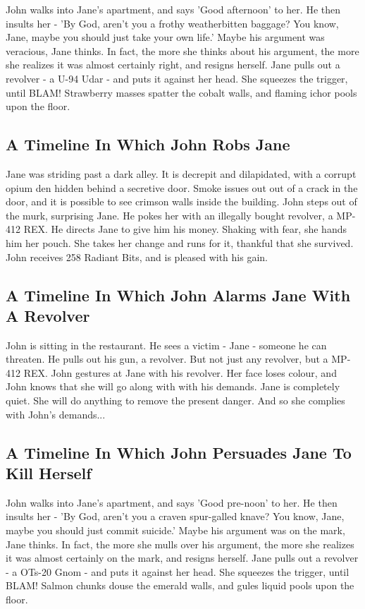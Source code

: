 \documentclass{article}
\begin{document}
John walks into Jane's apartment, and says 'Good afternoon' to her.
He then insults her {-} 'By God, aren't you a frothy weatherbitten baggage?
You know, Jane, maybe you should just take your own life.'
Maybe his argument was veracious, Jane thinks.
In fact, the more she thinks about his argument, the more she realizes it was almost certainly right, and resigns herself.
Jane pulls out a revolver {-} a U{-}94 Udar {-} and puts it against her head.
She squeezes the trigger, until BLAM!
Strawberry masses spatter the cobalt walls, and flaming ichor pools upon the floor.
\subsection{A Timeline In Which John Robs Jane}


Jane was striding past a dark alley.
It is decrepit and dilapidated, with a corrupt opium den hidden behind a secretive door.
Smoke issues out out of a crack in the door, and it is possible to see crimson walls inside the building.
John steps out of the murk, surprising Jane.
He pokes her with an illegally bought revolver, a MP{-}412 REX.
He directs Jane to give him his money.
Shaking with fear, she hands him her pouch.
She takes her change and runs for it, thankful that she survived.
John receives 258 Radiant Bits, and is pleased with his gain.
\subsection{A Timeline In Which John Alarms Jane With A Revolver}


John is sitting in the restaurant.
He sees a victim {-} Jane {-} someone he can threaten. He pulls out his gun, a revolver.
But not just any revolver, but a MP{-}412 REX.
John gestures at Jane with his revolver. Her face loses colour, and John knows that she will go along with with his demands.
Jane is completely quiet. She will do anything to remove the present danger. And so she complies with John's demands...
\subsection{A Timeline In Which John Persuades Jane To Kill Herself}


John walks into Jane's apartment, and says 'Good pre{-}noon' to her.
He then insults her {-} 'By God, aren't you a craven spur{-}galled knave?
You know, Jane, maybe you should just commit suicide.'
Maybe his argument was on the mark, Jane thinks.
In fact, the more she mulls over his argument, the more she realizes it was almost certainly on the mark, and resigns herself.
Jane pulls out a revolver {-} a OTs{-}20 Gnom {-} and puts it against her head.
She squeezes the trigger, until BLAM!
Salmon chunks douse the emerald walls, and gules liquid pools upon the floor.
\end{document}
